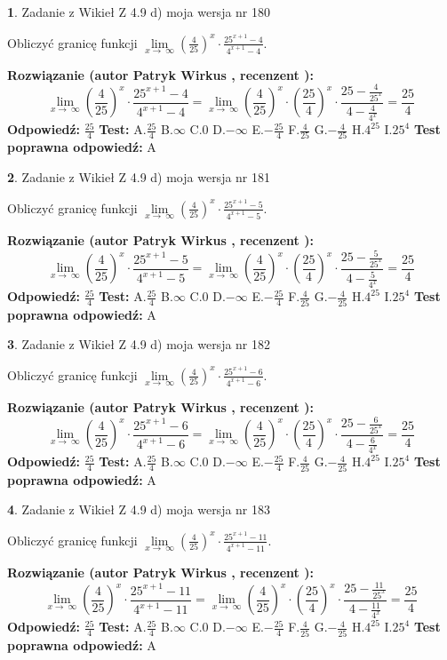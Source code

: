 \documentclass[12pt, a4paper]{article}
\theoremstyle{definition} %
\newtheorem{zad}{}
\newcommand{\zadStart}[1]{\begin{zad}#1\newline}
\newcommand{\zadStop}{\end{zad}}
\newcommand{\rozwStart}[2]{\noindent \textbf{Rozwiązanie (autor #1 , recenzent #2): }\newline}
\newcommand{\rozwStop}{\newline}
\newcommand{\odpStart}{\noindent \textbf{Odpowiedź:}\newline}
\newcommand{\odpStop}{\newline}
\newcommand{\testStart}{\noindent \textbf{Test:}\newline}
\newcommand{\testStop}{\newline}
\newcommand{\kluczStart}{\noindent \textbf{Test poprawna odpowiedź:}\newline}
\newcommand{\kluczStop}{\newline}
\begin{document}
\zadStart{Zadanie z Wikieł Z 4.9 d) moja wersja nr 180}


Obliczyć granicę funkcji  $\lim\limits_{x\to\ \infty}(\frac{4}{25})^{x}\cdot\frac{25^{x+1}-4}{4^{x+1}-4}$.
\zadStop
\rozwStart{Patryk Wirkus}{}
$$\lim\limits_{x\to\ \infty}(\frac{4}{25})^{x}\cdot\frac{25^{x+1}-4}{4^{x+1}-4}=\lim\limits_{x\to\ \infty}(\frac{4}{25})^{x}\cdot(\frac{25}{4})^{x} \cdot \frac{25-\frac{4}{25^{x}}}{4-\frac{4}{4^{x}}} = \frac{25}{4}$$
\rozwStop
\odpStart
$\frac{25}{4}$
\odpStop
\testStart
A.$\frac{25}{4}$ B.$\infty$ C.$0$ D.$-\infty$ E.$-\frac{25}{4}$
F.$\frac{4}{25}$ G.$-\frac{4}{25}$
H.$4^{25}$
I.$25^{4}$
\testStop
\kluczStart
A
\kluczStop



\zadStart{Zadanie z Wikieł Z 4.9 d) moja wersja nr 181}


Obliczyć granicę funkcji  $\lim\limits_{x\to\ \infty}(\frac{4}{25})^{x}\cdot\frac{25^{x+1}-5}{4^{x+1}-5}$.
\zadStop
\rozwStart{Patryk Wirkus}{}
$$\lim\limits_{x\to\ \infty}(\frac{4}{25})^{x}\cdot\frac{25^{x+1}-5}{4^{x+1}-5}=\lim\limits_{x\to\ \infty}(\frac{4}{25})^{x}\cdot(\frac{25}{4})^{x} \cdot \frac{25-\frac{5}{25^{x}}}{4-\frac{5}{4^{x}}} = \frac{25}{4}$$
\rozwStop
\odpStart
$\frac{25}{4}$
\odpStop
\testStart
A.$\frac{25}{4}$ B.$\infty$ C.$0$ D.$-\infty$ E.$-\frac{25}{4}$
F.$\frac{4}{25}$ G.$-\frac{4}{25}$
H.$4^{25}$
I.$25^{4}$
\testStop
\kluczStart
A
\kluczStop



\zadStart{Zadanie z Wikieł Z 4.9 d) moja wersja nr 182}


Obliczyć granicę funkcji  $\lim\limits_{x\to\ \infty}(\frac{4}{25})^{x}\cdot\frac{25^{x+1}-6}{4^{x+1}-6}$.
\zadStop
\rozwStart{Patryk Wirkus}{}
$$\lim\limits_{x\to\ \infty}(\frac{4}{25})^{x}\cdot\frac{25^{x+1}-6}{4^{x+1}-6}=\lim\limits_{x\to\ \infty}(\frac{4}{25})^{x}\cdot(\frac{25}{4})^{x} \cdot \frac{25-\frac{6}{25^{x}}}{4-\frac{6}{4^{x}}} = \frac{25}{4}$$
\rozwStop
\odpStart
$\frac{25}{4}$
\odpStop
\testStart
A.$\frac{25}{4}$ B.$\infty$ C.$0$ D.$-\infty$ E.$-\frac{25}{4}$
F.$\frac{4}{25}$ G.$-\frac{4}{25}$
H.$4^{25}$
I.$25^{4}$
\testStop
\kluczStart
A
\kluczStop



\zadStart{Zadanie z Wikieł Z 4.9 d) moja wersja nr 183}


Obliczyć granicę funkcji  $\lim\limits_{x\to\ \infty}(\frac{4}{25})^{x}\cdot\frac{25^{x+1}-11}{4^{x+1}-11}$.
\zadStop
\rozwStart{Patryk Wirkus}{}
$$\lim\limits_{x\to\ \infty}(\frac{4}{25})^{x}\cdot\frac{25^{x+1}-11}{4^{x+1}-11}=\lim\limits_{x\to\ \infty}(\frac{4}{25})^{x}\cdot(\frac{25}{4})^{x} \cdot \frac{25-\frac{11}{25^{x}}}{4-\frac{11}{4^{x}}} = \frac{25}{4}$$
\rozwStop
\odpStart
$\frac{25}{4}$
\odpStop
\testStart
A.$\frac{25}{4}$ B.$\infty$ C.$0$ D.$-\infty$ E.$-\frac{25}{4}$
F.$\frac{4}{25}$ G.$-\frac{4}{25}$
H.$4^{25}$
I.$25^{4}$
\testStop
\kluczStart
A
\kluczStop
\end{document}
